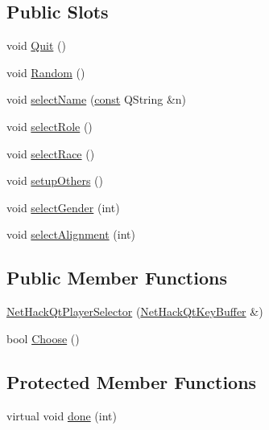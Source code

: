 \subsection*{Public Slots}
\begin{DoxyCompactItemize}
\item 
void \hyperlink{classNetHackQtPlayerSelector_adfa9137512a473f10a45d79e3e8bc8f5}{Quit} ()
\item 
void \hyperlink{classNetHackQtPlayerSelector_a16fc798e27dd433c19471038d4ecd6e1}{Random} ()
\item 
void \hyperlink{classNetHackQtPlayerSelector_a88783c745401064d6f0cd5634ce485dd}{select\+Name} (\hyperlink{tradstdc_8h_a2c212835823e3c54a8ab6d95c652660e}{const} Q\+String \&n)
\item 
void \hyperlink{classNetHackQtPlayerSelector_ad19b7bac19ce8f051c878466e8708651}{select\+Role} ()
\item 
void \hyperlink{classNetHackQtPlayerSelector_a25fbadcc8ae5d044edc873ea20f91e29}{select\+Race} ()
\item 
void \hyperlink{classNetHackQtPlayerSelector_af74454eb9c14725ca52f20946eddc391}{setup\+Others} ()
\item 
void \hyperlink{classNetHackQtPlayerSelector_ae4675f2a67f8efd300f97c752d932488}{select\+Gender} (int)
\item 
void \hyperlink{classNetHackQtPlayerSelector_af5b30e501f05d5ef00bdda44d64c0ec7}{select\+Alignment} (int)
\end{DoxyCompactItemize}
\subsection*{Public Member Functions}
\begin{DoxyCompactItemize}
\item 
\hyperlink{classNetHackQtPlayerSelector_a4b5329906ac8b8591bd7998c03cc8b51}{Net\+Hack\+Qt\+Player\+Selector} (\hyperlink{classNetHackQtKeyBuffer}{Net\+Hack\+Qt\+Key\+Buffer} \&)
\item 
bool \hyperlink{classNetHackQtPlayerSelector_a4b4f6e3b91c9aa1105d13a71b0adc308}{Choose} ()
\end{DoxyCompactItemize}
\subsection*{Protected Member Functions}
\begin{DoxyCompactItemize}
\item 
virtual void \hyperlink{classNetHackQtPlayerSelector_aa5f56c381c4ebc2b7730eccaddeed7e0}{done} (int)
\end{DoxyCompactItemize}

